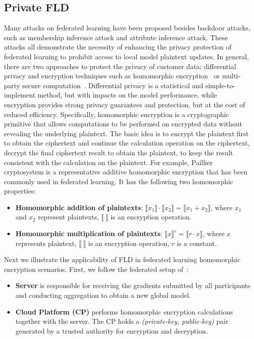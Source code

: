 \subsection{Private FLD}
Many attacks on federated learning have been proposed besides backdoor attacks, such as membership inference attack and attribute inference attack. These attacks all demonstrate the necessity of enhancing the privacy protection of federated learning to prohibit access to local model plaintext updates. In general, there are two approaches to protect the privacy of customer data: differential privacy and encryption techniques such as homomorphic encryption~\cite{hom} or multi-party secure computation~\cite{mpc}. Differential privacy is a statistical and simple-to-implement method, but with impacts on the model performance, while encryption provides strong privacy guarantees and protection, but at the cost of reduced efficiency.
Specifically, homomorphic encryption is a cryptographic primitive that allows computations to be performed on encrypted data without revealing the underlying plaintext. The basic idea is to encrypt the plaintext first to obtain the ciphertext and continue the calculation operation on the ciphertext, decrypt the final ciphertext result to obtain the plaintext, to keep the result consistent with the calculation on the plaintext. For example, Paillier cryptosystem is a representative additive homomorphic encryption that has been commonly used in federated learning. It has the following two homomorphic properties:
\begin{itemize}
\item \textbf{Homomorphic addition of plaintexts}: $\llbracket{ x_{1}\rrbracket}\cdot \llbracket{ x_{2}\rrbracket}= \llbracket{x_{1}+x_{2}\rrbracket}$, where $ x_{1}$ and $ x_{2}$ represent  plaintexts, $\llbracket{~\rrbracket}$ 
is an encryption operation.
\item \textbf{Homomorphic multiplication of plaintexts}: $ \llbracket{ x\rrbracket}^{r}= \llbracket{ r\cdot x\rrbracket} $, where  $ x$  represents  plaintext, $\llbracket{~\rrbracket}$ 
is an encryption operation, $r$ is  a constant.
\end{itemize}
Next we illustrate the applicability of FLD in federated learning homomorphic encryption scenarios.
First, we follow the federated setup of~\cite{privacyfl}:
\begin{itemize}
\item \textbf{Server} is responsible for receiving the gradients submitted by all participants and conducting aggregation to obtain a new global model.
\item \textbf{Cloud Platform (CP)} performs homomorphic encryption calculations together with the server. The CP holds a \textit{(private-key, public-key)} pair generated by a trusted authority for encryption and decryption.
\end{itemize}
